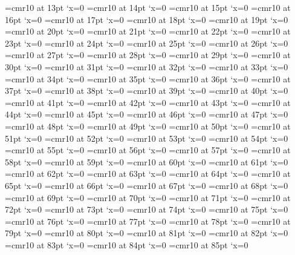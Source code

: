 \font\F=cmr10 at 13pt \lpcode\F`x=0
\font\F=cmr10 at 14pt \lpcode\F`x=0
\font\F=cmr10 at 15pt \lpcode\F`x=0
\font\F=cmr10 at 16pt \lpcode\F`x=0
\font\F=cmr10 at 17pt \lpcode\F`x=0
\font\F=cmr10 at 18pt \lpcode\F`x=0
\font\F=cmr10 at 19pt \lpcode\F`x=0
\font\F=cmr10 at 20pt \lpcode\F`x=0
\font\F=cmr10 at 21pt \lpcode\F`x=0
\font\F=cmr10 at 22pt \lpcode\F`x=0
\font\F=cmr10 at 23pt \lpcode\F`x=0
\font\F=cmr10 at 24pt \lpcode\F`x=0
\font\F=cmr10 at 25pt \lpcode\F`x=0
\font\F=cmr10 at 26pt \lpcode\F`x=0
\font\F=cmr10 at 27pt \lpcode\F`x=0
\font\F=cmr10 at 28pt \lpcode\F`x=0
\font\F=cmr10 at 29pt \lpcode\F`x=0
\font\F=cmr10 at 30pt \lpcode\F`x=0
\font\F=cmr10 at 31pt \lpcode\F`x=0
\font\F=cmr10 at 32pt \lpcode\F`x=0
\font\F=cmr10 at 33pt \lpcode\F`x=0
\font\F=cmr10 at 34pt \lpcode\F`x=0
\font\F=cmr10 at 35pt \lpcode\F`x=0
\font\F=cmr10 at 36pt \lpcode\F`x=0
\font\F=cmr10 at 37pt \lpcode\F`x=0
\font\F=cmr10 at 38pt \lpcode\F`x=0
\font\F=cmr10 at 39pt \lpcode\F`x=0
\font\F=cmr10 at 40pt \lpcode\F`x=0
\font\F=cmr10 at 41pt \lpcode\F`x=0
\font\F=cmr10 at 42pt \lpcode\F`x=0
\font\F=cmr10 at 43pt \lpcode\F`x=0
\font\F=cmr10 at 44pt \lpcode\F`x=0
\font\F=cmr10 at 45pt \lpcode\F`x=0
\font\F=cmr10 at 46pt \lpcode\F`x=0
\font\F=cmr10 at 47pt \lpcode\F`x=0
\font\F=cmr10 at 48pt \lpcode\F`x=0
\font\F=cmr10 at 49pt \lpcode\F`x=0
\font\F=cmr10 at 50pt \lpcode\F`x=0
\font\F=cmr10 at 51pt \lpcode\F`x=0
\font\F=cmr10 at 52pt \lpcode\F`x=0
\font\F=cmr10 at 53pt \lpcode\F`x=0
\font\F=cmr10 at 54pt \lpcode\F`x=0
\font\F=cmr10 at 55pt \lpcode\F`x=0
\font\F=cmr10 at 56pt \lpcode\F`x=0
\font\F=cmr10 at 57pt \lpcode\F`x=0
\font\F=cmr10 at 58pt \lpcode\F`x=0
\font\F=cmr10 at 59pt \lpcode\F`x=0
\font\F=cmr10 at 60pt \lpcode\F`x=0
\font\F=cmr10 at 61pt \lpcode\F`x=0
\font\F=cmr10 at 62pt \lpcode\F`x=0
\font\F=cmr10 at 63pt \lpcode\F`x=0
\font\F=cmr10 at 64pt \lpcode\F`x=0
\font\F=cmr10 at 65pt \lpcode\F`x=0
\font\F=cmr10 at 66pt \lpcode\F`x=0
\font\F=cmr10 at 67pt \lpcode\F`x=0
\font\F=cmr10 at 68pt \lpcode\F`x=0
\font\F=cmr10 at 69pt \lpcode\F`x=0
\font\F=cmr10 at 70pt \lpcode\F`x=0
\font\F=cmr10 at 71pt \lpcode\F`x=0
\font\F=cmr10 at 72pt \lpcode\F`x=0
\font\F=cmr10 at 73pt \lpcode\F`x=0
\font\F=cmr10 at 74pt \lpcode\F`x=0
\font\F=cmr10 at 75pt \lpcode\F`x=0
\font\F=cmr10 at 76pt \lpcode\F`x=0
\font\F=cmr10 at 77pt \lpcode\F`x=0
\font\F=cmr10 at 78pt \lpcode\F`x=0
\font\F=cmr10 at 79pt \lpcode\F`x=0
\font\F=cmr10 at 80pt \lpcode\F`x=0
\font\F=cmr10 at 81pt \lpcode\F`x=0
\font\F=cmr10 at 82pt \lpcode\F`x=0
\font\F=cmr10 at 83pt \lpcode\F`x=0
\font\F=cmr10 at 84pt \lpcode\F`x=0
\font\F=cmr10 at 85pt \lpcode\F`x=0
